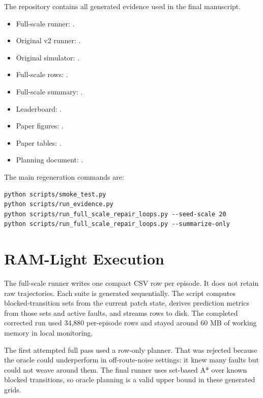 \documentclass{article}
\begin{document}
The repository contains all generated evidence used in the final manuscript.
\begin{itemize}
    \item Full-scale runner: .
    \item Original v2 runner: .
    \item Original simulator: .
    \item Full-scale rows: .
    \item Full-scale summary: .
    \item Leaderboard: .
    \item Paper figures: .
    \item Paper tables: .
    \item Planning document: .
\end{itemize}

The main regeneration commands are:
\begin{verbatim}
python scripts/smoke_test.py
python scripts/run_evidence.py
python scripts/run_full_scale_repair_loops.py --seed-scale 20
python scripts/run_full_scale_repair_loops.py --summarize-only
\end{verbatim}

\section{RAM-Light Execution}

The full-scale runner writes one compact CSV row per episode. It does not retain raw trajectories. Each suite is generated sequentially. The script computes blocked-transition sets from the current patch state, derives prediction metrics from those sets and active faults, and streams rows to disk. The completed corrected run used 34,880 per-episode rows and stayed around 60 MB of working memory in local monitoring.

The first attempted full pass used a row-only planner. That was rejected because the oracle could underperform in off-route-noise settings: it knew many faults but could not weave around them. The final runner uses set-based A* over known blocked transitions, so oracle planning is a valid upper bound in these generated grids.
\end{document}
